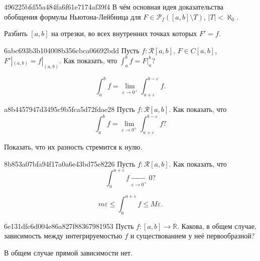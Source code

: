 \begin{note}{496225bfd55a484fa6f61e7174af39f4}
    В чём основная идея доказательства обобщения формулы Ньютона-Лейбница для \({ F \in \mathscr P_f ([a, b] \setminus T) }\),\: \({ |T| < \aleph_0 }\).

    \begin{cloze}{1}
        Разбить \({ [a, b] }\) на отрезки, во всех внутренних точках которых \({ F' = f }\).
    \end{cloze}
\end{note}

\begin{note}{6abc693b3b104008b356cbca06692bdd}
    Пусть \({ f : \mathcal R[a, b] }\), \({ F \in C[a, b] }\), \({ F'|_{(a, b)} = f|_{(a, b)} }\).
    Как показать, что \({ \int_{a}^{b} f = F\big|_{a}^{b} }\)?

    \begin{cloze}{1}
        \[
            \int_{a}^{b} f  = \lim_{\varepsilon \to 0^{+}} \int_{a + \varepsilon}^{b - \varepsilon} f.
        \]
    \end{cloze}
\end{note}

\begin{note}{a8b4457947d3495c9b5fca5d72fdae28}
    Пусть \({ f : \mathcal R[a, b] }\). Как показать, что
    \[
        \int_{a}^{b} f = \lim_{\varepsilon \to 0^{+}} \int_{a + \varepsilon}^{b - \varepsilon} f?
    \]

    \begin{cloze}{1}
        Показать, что их разность стремится к нулю.
    \end{cloze}
\end{note}

\begin{note}{8b853a07bfa94f17a0a6e43bd75e8226}
    Пусть \({ f : \mathcal R[a, b] }\). Как показать, что
    \[
        \int_{a}^{a + \varepsilon} f \underset{\varepsilon \to 0^{+}}\longrightarrow 0?
    \]

    \begin{cloze}{1}
        \[
            m\varepsilon \leqslant \int_{a}^{a + \varepsilon} f \leqslant M\varepsilon.
        \]
    \end{cloze}
\end{note}

\begin{note}{6e131dfc6d004e86a827f88367981953}
    Пусть \({ f : [a, b] \to \mathbb R }\).
    Какова, в общем случае, зависимость между интегрируемостью \({ f }\) и существованием у неё первообразной?

    \begin{cloze}{1}
        В общем случае прямой зависимости нет.
    \end{cloze}
\end{note}

